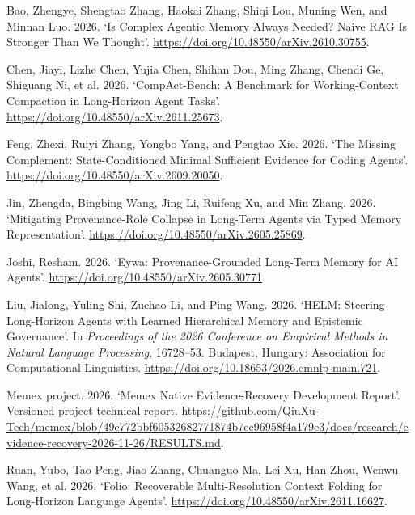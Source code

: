 \documentclass[
  11pt,
  a4paper,
]{article}
\newlength{\cslhangindent}
\newenvironment{CSLReferences}[2] %
 {\begin{list}{}{%
  \setlength{\itemindent}{0pt}
  \setlength{\leftmargin}{0pt}
  \setlength{\parsep}{0pt}
  \ifodd #1
   \setlength{\leftmargin}{\cslhangindent}
   \setlength{\itemindent}{-1\cslhangindent}
  \fi
  \setlength{\itemsep}{#2\baselineskip}}}
 {\end{list}}
\begin{document}
\label{refs}
\begin{CSLReferences}{1}{0}
Bao, Zhengye, Shengtao Zhang, Haokai Zhang, Shiqi Lou, Muning Wen, and
Minnan Luo. 2026. {`Is Complex Agentic Memory Always Needed? Naive {RAG}
Is Stronger Than We Thought'}.
\url{https://doi.org/10.48550/arXiv.2610.30755}.

Chen, Jiayi, Lizhe Chen, Yujia Chen, Shihan Dou, Ming Zhang, Chendi Ge,
Shiguang Ni, et al. 2026. {`{CompAct-Bench}: A Benchmark for
Working-Context Compaction in Long-Horizon Agent Tasks'}.
\url{https://doi.org/10.48550/arXiv.2611.25673}.

Feng, Zhexi, Ruiyi Zhang, Yongbo Yang, and Pengtao Xie. 2026. {`The
Missing Complement: State-Conditioned Minimal Sufficient Evidence for
Coding Agents'}. \url{https://doi.org/10.48550/arXiv.2609.20050}.

Jin, Zhengda, Bingbing Wang, Jing Li, Ruifeng Xu, and Min Zhang. 2026.
{`Mitigating Provenance-Role Collapse in Long-Term Agents via Typed
Memory Representation'}.
\url{https://doi.org/10.48550/arXiv.2605.25869}.

Joshi, Resham. 2026. {`{Eywa}: Provenance-Grounded Long-Term Memory for
{AI} Agents'}. \url{https://doi.org/10.48550/arXiv.2605.30771}.

Liu, Jialong, Yuling Shi, Zuchao Li, and Ping Wang. 2026. {`{HELM}:
Steering Long-Horizon Agents with Learned Hierarchical Memory and
Epistemic Governance'}. In \emph{Proceedings of the 2026 Conference on
Empirical Methods in Natural Language Processing}, 16728--53. Budapest,
Hungary: Association for Computational Linguistics.
\url{https://doi.org/10.18653/2026.emnlp-main.721}.

Memex project. 2026. {`Memex Native Evidence-Recovery Development
Report'}. Versioned project technical report.
\url{https://github.com/QiuXu-Tech/memex/blob/49e772bbf60532682771874b7ec96958f4a179e3/docs/research/evidence-recovery-2026-11-26/RESULTS.md}.

Ruan, Yubo, Tao Peng, Jiao Zhang, Chuanguo Ma, Lei Xu, Han Zhou, Wenwu
Wang, et al. 2026. {`{Folio}: Recoverable Multi-Resolution Context
Folding for Long-Horizon Language Agents'}.
\url{https://doi.org/10.48550/arXiv.2611.16627}.


\end{CSLReferences}
\end{document}
